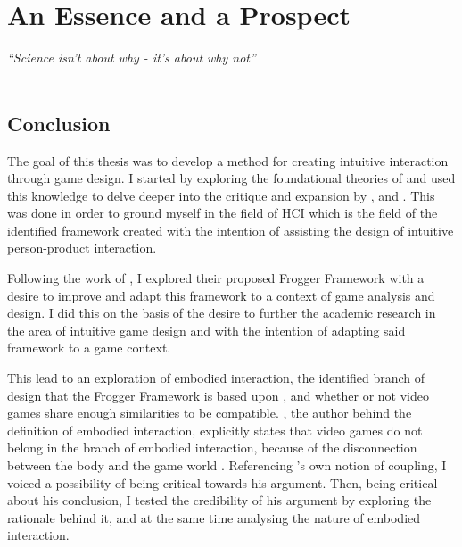 \chapter{An Essence and a Prospect}
\textit{``Science isn't about why - it's about why not''} \\
 \\

\section{Conclusion}
The goal of this thesis was to develop a method for creating intuitive interaction through game design. I started by exploring the foundational theories of  and used this knowledge to delve deeper into the critique and expansion by ,  and . This was done in order to ground myself in the field of HCI which is the field of the identified framework created with the intention of assisting the design of intuitive person-product interaction.

Following the work of , I explored their proposed Frogger Framework with a desire to improve and adapt this framework to a context of game analysis and design. I did this on the basis of the desire to further the academic research in the area of intuitive game design and with the intention of adapting said framework to a game context.

This lead to an exploration of embodied interaction, the identified branch of design that the Frogger Framework is based upon \cite{frogger}, and whether or not video games share enough similarities to be compatible. , the author behind the definition of embodied interaction, explicitly states that video games do not belong in the branch of embodied interaction, because of the disconnection between the body and the game world \cite{dourish}. Referencing \citeauthor{dourish}'s \citeyear{dourish} own notion of coupling, I voiced a possibility of being critical towards his argument. Then, being critical about his conclusion, I tested the credibility of his argument by exploring the rationale behind it, and at the same time analysing the nature of embodied interaction.

